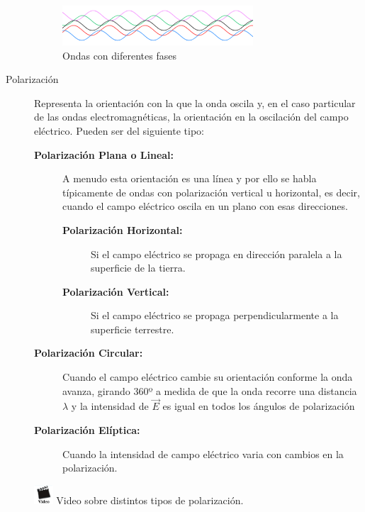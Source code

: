 \begin{description}
\begin{figure}[!h]
  \centering
  \includegraphics[width=0.7\textwidth]{06.radionavegacion/Imagenes/06.01.adf/desfase-ondas.png}
  \caption{Ondas con diferentes fases \protect\cite{wikipedia_esp}}
  \label{fig:desfase-ondas}
\end{figure}


\item [Polarizaci\'on] Representa la orientaci\'on con la que la onda oscila y, en el caso particular de las ondas electromagn\'eticas, la orientaci\'on en la oscilaci\'on del campo el\'ectrico. 
Pueden ser del siguiente tipo:

\begin{description}
\item[\bf Polarizaci\'on Plana o Lineal:] A menudo esta orientaci\'on es una l\'inea y por ello se habla t\'ipicamente de ondas con polarizaci\'on vertical u horizontal, es decir, cuando el campo el\'ectrico oscila en un plano con esas direcciones.
  \begin{description}
  \item[\bf Polarizaci\'on Horizontal:] Si el campo eléctrico se propaga en dirección paralela a la superficie de la tierra.
  \item[\bf Polarizaci\'on Vertical:] Si el campo eléctrico se propaga perpendicularmente a la superficie terrestre.
  \end{description}

\item[\bf Polarizaci\'on Circular:] Cuando el campo el\'ectrico cambie su orientaci\'on conforme la onda avanza, girando 360º a medida de que la onda recorre una distancia $\lambda$ y la intensidad de $\vec{E}$ es igual en todos los \'angulos de polarizaci\'on

\item[\bf Polarizaci\'on El\'iptica:] Cuando la intensidad de campo eléctrico varia con cambios en la polarización.

\end{description}

\href{https://www.youtube.com/watch?v=Q0qrU4nprB0}{\includegraphics[width=20pt]{imagenes.iconos/video.jpg}} Video sobre distintos tipos de polarización.



\end{description}
